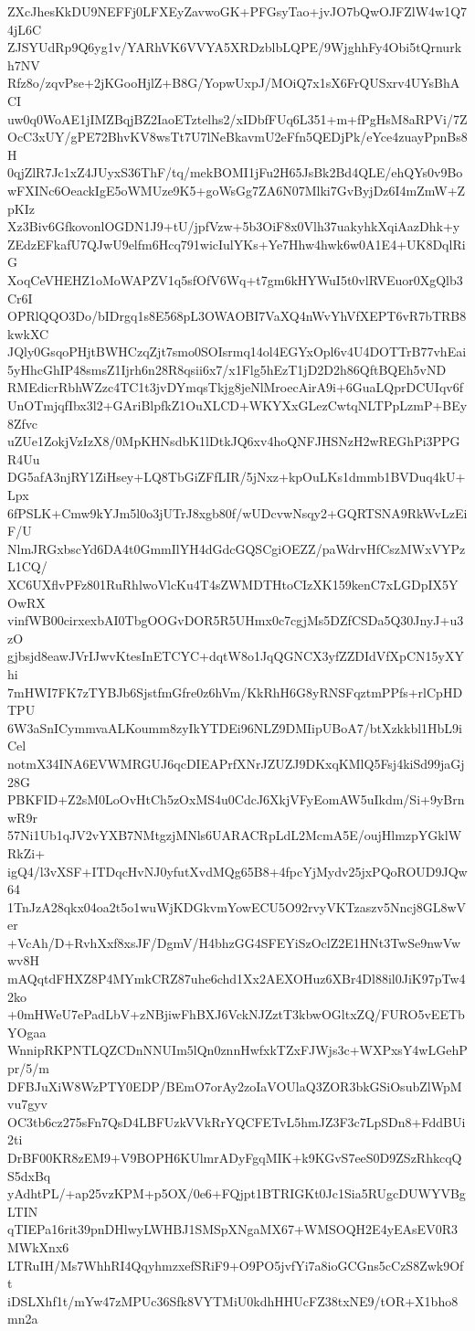 ZXcJhesKkDU9NEFFj0LFXEyZavwoGK+PFGsyTao+jvJO7bQwOJFZlW4w1Q74jL6C
ZJSYUdRp9Q6yg1v/YARhVK6VVYA5XRDzblbLQPE/9WjghhFy4Obi5tQrnurkh7NV
Rfz8o/zqvPse+2jKGooHjlZ+B8G/YopwUxpJ/MOiQ7x1sX6FrQUSxrv4UYsBhACI
uw0q0WoAE1jIMZBqjBZ2IaoETztelhs2/xIDbfFUq6L351+m+fPgHsM8aRPVi/7Z
OcC3xUY/gPE72BhvKV8wsTt7U7lNeBkavmU2eFfn5QEDjPk/eYce4zuayPpnBs8H
0qjZlR7Jc1xZ4JUyxS36ThF/tq/mekBOMI1jFu2H65JsBk2Bd4QLE/ehQYs0v9Bo
wFXINc6OeackIgE5oWMUze9K5+goWsGg7ZA6N07Mlki7GvByjDz6I4mZmW+ZpKIz
Xz3Biv6GfkovonlOGDN1J9+tU/jpfVzw+5b3OiF8x0Vlh37uakyhkXqiAazDhk+y
ZEdzEFkafU7QJwU9elfm6Hcq791wicIulYKs+Ye7Hhw4hwk6w0A1E4+UK8DqlRiG
XoqCeVHEHZ1oMoWAPZV1q5sfOfV6Wq+t7gm6kHYWuI5t0vlRVEuor0XgQlb3Cr6I
OPRlQQO3Do/bIDrgq1s8E568pL3OWAOBI7VaXQ4nWvYhVfXEPT6vR7bTRB8kwkXC
JQly0GsqoPHjtBWHCzqZjt7smo0SOIsrmq14ol4EGYxOpl6v4U4DOTTrB77vhEai
5yHhcGhIP48smsZ1Ijrh6n28R8qsii6x7/x1Flg5hEzT1jD2D2h86QftBQEh5vND
RMEdicrRbhWZzc4TC1t3jvDYmqsTkjg8jeNlMroecAirA9i+6GuaLQprDCUIqv6f
UnOTmjqfIbx3l2+GAriBlpfkZ1OuXLCD+WKYXxGLezCwtqNLTPpLzmP+BEy8Zfvc
uZUe1ZokjVzIzX8/0MpKHNsdbK1lDtkJQ6xv4hoQNFJHSNzH2wREGhPi3PPGR4Uu
DG5afA3njRY1ZiHsey+LQ8TbGiZFfLIR/5jNxz+kpOuLKs1dmmb1BVDuq4kU+Lpx
6fPSLK+Cmw9kYJm5l0o3jUTrJ8xgb80f/wUDcvwNsqy2+GQRTSNA9RkWvLzEiF/U
NlmJRGxbscYd6DA4t0GmmIlYH4dGdcGQSCgiOEZZ/paWdrvHfCszMWxVYPzL1CQ/
XC6UXflvPFz801RuRhlwoVlcKu4T4sZWMDTHtoCIzXK159kenC7xLGDpIX5YOwRX
vinfWB00cirxexbAI0TbgOOGvDOR5R5UHmx0c7cgjMs5DZfCSDa5Q30JnyJ+u3zO
gjbsjd8eawJVrIJwvKtesInETCYC+dqtW8o1JqQGNCX3yfZZDIdVfXpCN15yXYhi
7mHWI7FK7zTYBJb6SjstfmGfre0z6hVm/KkRhH6G8yRNSFqztmPPfs+rlCpHDTPU
6W3aSnICymmvaALKoumm8zyIkYTDEi96NLZ9DMIipUBoA7/btXzkkbl1HbL9iCel
notmX34INA6EVWMRGUJ6qcDIEAPrfXNrJZUZJ9DKxqKMlQ5Fsj4kiSd99jaGj28G
PBKFID+Z2sM0LoOvHtCh5zOxMS4u0CdcJ6XkjVFyEomAW5uIkdm/Si+9yBrnwR9r
57Ni1Ub1qJV2vYXB7NMtgzjMNls6UARACRpLdL2McmA5E/oujHlmzpYGklWRkZi+
igQ4/l3vXSF+ITDqcHvNJ0yfutXvdMQg65B8+4fpcYjMydv25jxPQoROUD9JQw64
1TnJzA28qkx04oa2t5o1wuWjKDGkvmYowECU5O92rvyVKTzaszv5Nncj8GL8wVer
+VcAh/D+RvhXxf8xsJF/DgmV/H4bhzGG4SFEYiSzOclZ2E1HNt3TwSe9nwVwwv8H
mAQqtdFHXZ8P4MYmkCRZ87uhe6chd1Xx2AEXOHuz6XBr4Dl88il0JiK97pTw42ko
+0mHWeU7ePadLbV+zNBjiwFhBXJ6VckNJZztT3kbwOGltxZQ/FURO5vEETbYOgaa
WnnipRKPNTLQZCDnNNUIm5lQn0znnHwfxkTZxFJWjs3c+WXPxsY4wLGehPpr/5/m
DFBJuXiW8WzPTY0EDP/BEmO7orAy2zoIaVOUlaQ3ZOR3bkGSiOsubZlWpMvu7gyv
OC3tb6cz275sFn7QsD4LBFUzkVVkRrYQCFETvL5hmJZ3F3c7LpSDn8+FddBUi2ti
DrBF00KR8zEM9+V9BOPH6KUlmrADyFgqMIK+k9KGvS7eeS0D9ZSzRhkcqQS5dxBq
yAdhtPL/+ap25vzKPM+p5OX/0e6+FQjpt1BTRIGKt0Jc1Sia5RUgcDUWYVBgLTIN
qTIEPa16rit39pnDHlwyLWHBJ1SMSpXNgaMX67+WMSOQH2E4yEAsEV0R3MWkXnx6
LTRuIH/Ms7WhhRI4QqyhmzxefSRiF9+O9PO5jvfYi7a8ioGCGns5cCzS8Zwk9Oft
iDSLXhf1t/mYw47zMPUc36Sfk8VYTMiU0kdhHHUcFZ38txNE9/tOR+X1bho8mn2a

